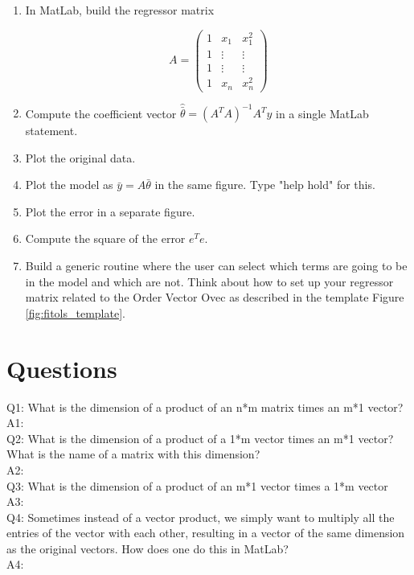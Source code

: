 \documentclass[11pt,letterpaper]{article}
\begin{document}
\begin{enumerate}

\item In MatLab, build the regressor matrix

\begin{equation}\label{Eqn:OLS7}
A =
\begin{pmatrix}
1 & x_1    & x_1^2\\
1 & \vdots &\vdots \\
1 & \vdots & \vdots\\
1 & x_n    & x_n^2
\end{pmatrix}
\end{equation}

\item Compute the coefficient vector $\hat{\bar{\theta}} = \left(A^TA \right)^{-1} A^T y$ in a single MatLab statement.
\item Plot the original data.
\item Plot the model as $\bar{y} = A \bar{\theta} $ in the same figure. Type "help hold" for this.
\item Plot the error in a separate figure.
\item Compute the square of the error $e^T e$.
\item Build a generic routine where the user can select which terms are going to be in the model and which are not. Think about how to set up your regressor matrix related to the Order Vector Ovec as described in the template Figure \ref{fig:fitols_template}.
\end{enumerate}

\section{Questions}

Q1:	What is the dimension of a product of an n*m matrix times an m*1 vector? \\
A1:\\


Q2: What is the dimension of a product of a 1*m vector times an m*1 vector? What is the name of a matrix with this dimension? \\
A2:\\

Q3:	What is the dimension of a product of an m*1 vector times a 1*m vector \\
A3:\\


Q4: Sometimes instead of a vector product, we simply want to multiply all the entries of the vector with each other, resulting in a vector of the same dimension as the original vectors. How does one do this in MatLab? \\
A4:\\
\end{document}
